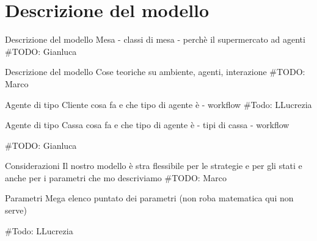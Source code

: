 \section{Descrizione del modello}
\begin{frame}{Descrizione del modello}
	\centering
	Mesa - classi di mesa - perchè il supermercato ad agenti
	\#TODO: Gianluca
\end{frame}

\begin{frame}{Descrizione del modello}
	\centering
	Cose teoriche su ambiente, agenti, interazione
	\#TODO: Marco

\end{frame}

\begin{frame}{Agente di tipo Cliente}
	\centering
	cosa fa e che tipo di agente è - workflow
	\#Todo: LLucrezia
\end{frame}

\begin{frame}{Agente di tipo Cassa}
	\centering
	cosa fa e che tipo di agente è - tipi di cassa - workflow

	\#TODO: Gianluca
\end{frame}

\begin{frame}{Considerazioni}
	\centering
	Il nostro modello è stra flessibile per le strategie e per gli stati e anche per i parametri che mo descriviamo
	\#TODO: Marco

\end{frame}

\begin{frame}{Parametri}
	\centering
	Mega elenco puntato dei parametri (non roba matematica qui non serve)

	\#Todo: LLucrezia
\end{frame}